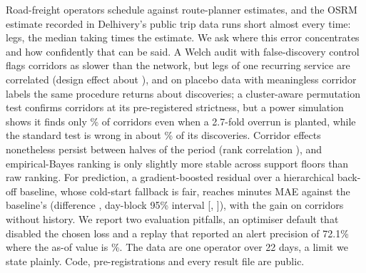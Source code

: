 Road-freight operators schedule against route-planner estimates, and the OSRM estimate recorded in Delhivery's public trip data runs short almost every time: \fzLegsTotal{} legs, the median taking \fzMedianGapRatioDpOne{} times the estimate. We ask where this error concentrates and how confidently that can be said. A Welch audit with false-discovery control flags \fzBottlenecks{} corridors as slower than the network, but legs of one recurring service are correlated (design effect about \fzDepDesignEffectMedianDpOne{}), and on placebo data with meaningless corridor labels the same procedure returns about \fzAuditPlaceboDiscoveriesDpOne{} discoveries; a cluster-aware permutation test confirms \fzAuditRobustHeadlineSlower{} corridors at its pre-registered strictness, but a power simulation shows it finds only \fzPowerByPermShiftOnePct{}\% of corridors even when a 2.7-fold overrun is planted, while the standard test is wrong in about \fzPowerWelchBhFdpShiftHalfPct{}\% of its discoveries. Corridor effects nonetheless persist between halves of the period (rank correlation \fzStabilitySpearmanDpTwo{}), and empirical-Bayes ranking is only slightly more stable across support floors than raw ranking. For prediction, a gradient-boosted residual over a hierarchical back-off baseline, whose cold-start fallback is fair, reaches \fzReportedMaeDpTwo{} minutes MAE against the baseline's \fzBarBackoffMaeDpTwo{} (difference \fzReportedVsBarDeltaDpTwo{}, day-block 95\% interval [\fzReportedVsBarCiLowDpTwo{}, \fzReportedVsBarCiHighDpTwo{}]), with the gain on corridors without history. We report two evaluation pitfalls, an optimiser default that disabled the chosen loss and a replay that reported an alert precision of 72.1\% where the as-of value is \fzExcPrecisionAsOfRatePct{}\%. The data are one operator over 22 days, a limit we state plainly. Code, pre-registrations and every result file are public.
